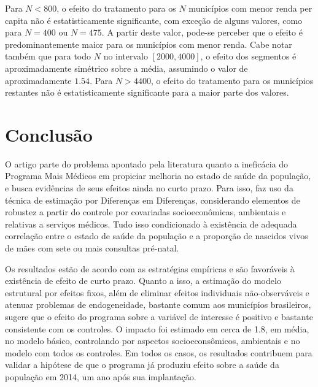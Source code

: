 \documentclass[twoside,onecolumn,12pt]{article}
\numberwithin{outputctr}{section}
\begin{document}
Para $N < 800$, o efeito do tratamento para os $N$ munic\'{i}pios com menor renda per capita n\~{a}o \'{e} estatisticamente significante,
com exce\c{c}\~{a}o de alguns valores, como para $N=400$ ou $N=475$. A partir deste valor,
pode-se perceber que o efeito \'{e} predominantemente maior para os municípios com menor renda.
Cabe notar também que para todo $N$ no intervalo $[2000,4000]$, o efeito dos segmentos \'{e} aproximadamente sim\'{e}trico sobre a m\'{e}dia, assumindo o valor de aproximadamente $1.54$.
Para $N > 4400$, o efeito do tratamento para os munic\'{i}pios restantes n\~{a}o \'{e} estatisticamente significante para a maior parte dos valores.




\section{Conclus\~{a}o \label{secConclusao}}

O artigo parte do problema apontado pela literatura quanto a ineficácia do Programa Mais Médicos em propiciar melhoria no estado de saúde da população, e busca evidências de seus efeitos ainda no curto prazo. Para isso, faz uso da técnica de estimação por Diferenças em Diferenças, considerando elementos de robustez a partir do controle por covariadas socioeconômicas, ambientais e relativas a serviços médicos. Tudo isso condicionado à existência de adequada correlação entre o estado de saúde da população e a propor\c{c}\~{a}o de nascidos vivos de m\~{a}es com sete ou mais consultas pr\'{e}-natal.

Os resultados estão de acordo com as estratégias empíricas e são favoráveis à existência de efeito de curto prazo. Quanto a isso, a estima\c{c}\~{a}o do modelo estrutural por efeitos fixos, al\'{e}m de eliminar efeitos individuais n\~{a}o-observ\'{a}veis e atenuar problemas de endogeneidade, bastante comum aos munic\'{i}pios brasileiros, sugere que o efeito do programa sobre a variável de interesse é positivo e bastante consistente com os controles. O impacto foi estimado em cerca de 1.8, em média, no modelo básico, controlando por aspectos socioeconsômicos, ambientais e no modelo com todos os controles. Em todos os casos, os resultados contribuem para validar a hipótese de que o programa já produziu efeito sobre a saúde da população em 2014, um ano após sua implantação. 
\end{document}
